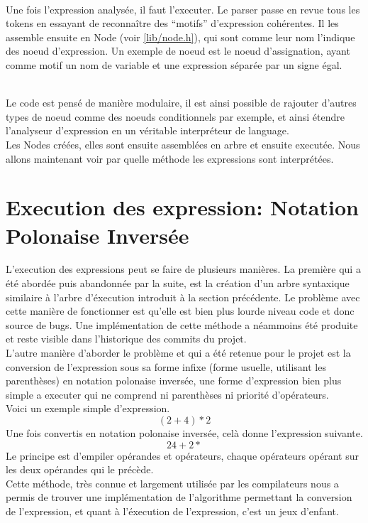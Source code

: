         \paragraph{}
            Une fois l'expression analysée, il faut l'executer. Le parser passe en revue tous les tokens en essayant de reconnaître des ``motifs'' d'expression cohérentes. Il les assemble ensuite en Node (voir \ref{lib/node.h}), qui sont comme leur nom l'indique des noeud d'expression. Un exemple de noeud est le noeud d'assignation, ayant comme motif un nom de variable et une expression séparée par un signe égal.

            \newpage

            \\ Le code est pensé de manière modulaire, il est ainsi possible de rajouter d'autres types de noeud comme des noeuds conditionnels par exemple, et ainsi étendre l'analyseur d'expression en un véritable interpréteur de language.
            \\ Les Nodes créées, elles sont ensuite assemblées en arbre et ensuite executée. Nous allons maintenant voir par quelle méthode les  expressions sont interprétées.

    \section{Execution des expression: Notation Polonaise Inversée}
        L'execution des expressions peut se faire de plusieurs manières. La première qui a été abordée puis abandonnée par la suite, est la création d'un arbre syntaxique similaire à l'arbre d'éxecution introduit à la section précédente. Le problème avec cette manière de fonctionner est qu'elle est bien plus lourde niveau code et donc source de bugs. Une implémentation de cette méthode a néammoins été produite et reste visible dans l'historique des commits du projet.
        \\ L'autre manière d'aborder le problème et qui a été retenue pour le projet est la conversion de l'expression sous sa forme infixe (forme usuelle, utilisant les parenthèses) en notation polonaise inversée, une forme d'expression bien plus simple a executer qui ne comprend ni parenthèses ni priorité d'opérateurs.
        \\ Voici un exemple simple d'expression.
        \begin{equation}
            (2 + 4) * 2
        \end{equation}
        Une fois convertis en notation polonaise inversée, celà donne l'expression suivante.
        \begin{equation}
            2 4 + 2 *
        \end{equation}
        Le principe est d'empiler opérandes et opérateurs, chaque opérateurs opérant sur les deux opérandes qui le précède.
        \\ Cette méthode, très connue et largement utilisée par les compilateurs nous a permis de trouver une implémentation de l'algorithme permettant la conversion de l'expression, et quant à l'éxecution de l'expression, c'est un jeux d'enfant.